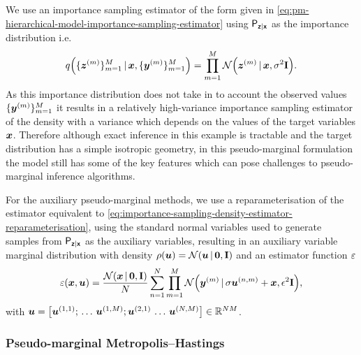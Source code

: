 We use an importance sampling estimator of the form given in \eqref{eq:pm-hierarchical-model-importance-sampling-estimator} using $\mathsf{P}_{\boldsymbol{\mathsf{z}}|\boldsymbol{\mathsf{x}}}$ as the importance distribution  i.e.
\begin{equation}
  q\lpa\lbrace \vct{z}^{(m)} \rbrace_{m=1}^M \gvn \vct{x}, \lbrace \vct{y}^{(m)} \rbrace_{m=1}^M\rpa 
  = \prod_{m=1}^M \nrm{\vct{z}^{(m)} \gvn \vct{x}, \sigma^2 \mathbf{I}}.
\end{equation}
As this importance distribution does not take in to account the observed values $\lbrace \boldsymbol{y}^{(m)}\rbrace_{m=1}^M$ it results in a relatively high-variance importance sampling estimator of the density with a variance which depends on the values of the target variables $\boldsymbol{x}$. Therefore although exact inference in this example is tractable and the target distribution has a simple isotropic geometry, in this pseudo-marginal formulation the model still has some of the key features which can pose challenges to pseudo-marginal inference algorithms.

For the auxiliary pseudo-marginal methods, we use a reparameterisation of the estimator equivalent to \eqref{eq:importance-sampling-density-estimator-reparameterisation}, using the standard normal variables used to generate samples from $\mathsf{P}_{\boldsymbol{\mathsf{z}}|\boldsymbol{\mathsf{x}}}$ as the auxiliary variables, resulting in an auxiliary variable marginal distribution with density $\rho(\vct{u}) = \nrm{\vct{u}\gvn\vct{0},\mathbf{I}}$ and an estimator function $\varepsilon$
\begin{equation}
  \esttgtdens(\vct{x},\vct{u}) =
  \frac{\nrm{\vct{x} \gvn \vct{0},\mathbf{I}}}{N} \sum_{n=1}^N 
  \prod_{m=1}^M \nrm{\vct{y}^{(m)} \gvn \sigma \vct{u}^{(n,m)} + \vct{x}, \epsilon^2\mathbf{I}},
\end{equation}
with $\vct{u} = \lsb \vct{u}^{(1,1)}; \,\dots\, \vct{u}^{(1,M)}; \vct{u}^{(2,1)}\,\dots\,\vct{u}^{(N,M)}\rsb \in \reals^{NM}$.

\subsubsection{Pseudo-marginal Metropolis--Hastings}

